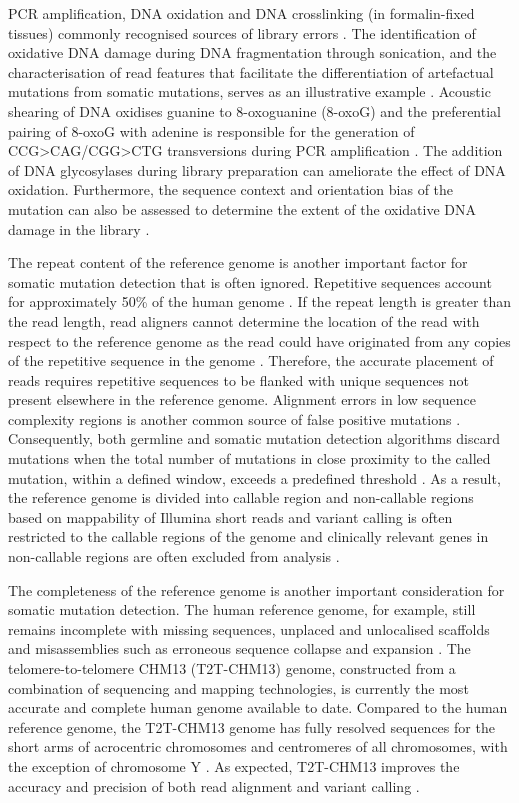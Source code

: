 PCR amplification, DNA oxidation and DNA crosslinking (in formalin-fixed tissues) commonly recognised sources of library errors \cite{Chen2017-ba}. The identification of oxidative DNA damage during DNA fragmentation through sonication, and the characterisation of read features that facilitate the differentiation of artefactual mutations from somatic mutations, serves as an illustrative example \cite{Costello2013-cz}. Acoustic shearing of DNA oxidises guanine to 8-oxoguanine (8-oxoG) and the preferential pairing of 8-oxoG with adenine \cite{Shibutani1991-tw} is responsible for the generation of CCG>CAG/CGG>CTG transversions during PCR amplification \cite{Costello2013-cz}. The addition of DNA glycosylases during library preparation can ameliorate the effect of DNA oxidation. Furthermore, the sequence context and orientation bias of the mutation can also be assessed to determine the extent of the oxidative DNA damage in the library \cite{Costello2013-cz}. 

The repeat content of the reference genome is another important factor for somatic mutation detection that is often ignored. Repetitive sequences account for approximately 50\% of the human genome \cite{Lander2001-du}. If the repeat length is greater than the read length, read aligners cannot determine the location of the read with respect to the reference genome as the read could have originated from any copies of the repetitive sequence in the genome \cite{Li2008-dt}. Therefore, the accurate placement of reads requires repetitive sequences to be flanked with unique sequences not present elsewhere in the reference genome. Alignment errors in low sequence complexity regions is another common source of false positive mutations \cite{Li2014-ra}. Consequently, both germline and somatic mutation detection algorithms discard mutations when the total number of mutations in close proximity to the called mutation, within a defined window, exceeds a predefined threshold \cite{Cibulskis2013-gw, DePristo2011-vf}. As a result, the reference genome is divided into callable region and non-callable regions based on mappability of Illumina short reads and variant calling is often restricted to the callable regions of the genome \cite{1000_Genomes_Project_Consortium2012-rj} and clinically relevant genes in non-callable regions are often excluded from analysis \cite{Wagner2022-ph}. 

The completeness of the reference genome is another important consideration for somatic mutation detection. The human reference genome, for example, still remains incomplete with missing sequences, unplaced and unlocalised scaffolds and misassemblies such as erroneous sequence collapse and expansion \cite{Schneider2017-yo}. The telomere-to-telomere CHM13 (T2T-CHM13) genome, constructed from a combination of sequencing and mapping technologies, is currently the most accurate and complete human genome available to date. Compared to the human reference genome, the T2T-CHM13 genome has fully resolved sequences for the short arms of acrocentric chromosomes and centromeres of all chromosomes, with the exception of chromosome Y \cite{Nurk2022-dv}. As expected, T2T-CHM13 improves the accuracy and precision of both read alignment and variant calling \cite{Aganezov2022-dv}. 

